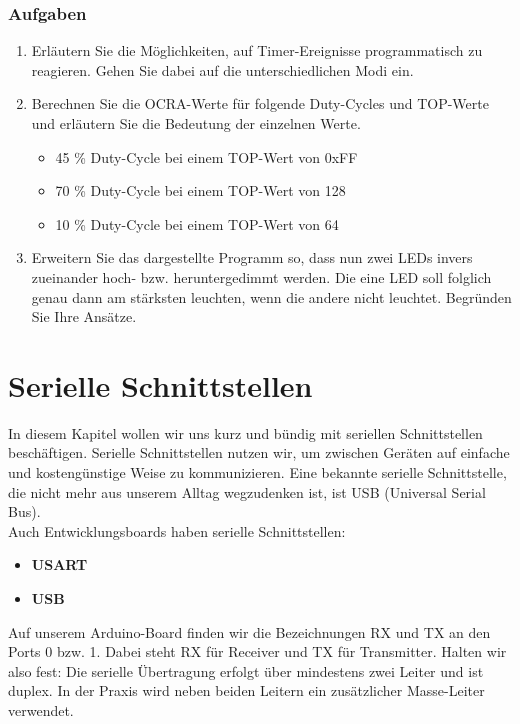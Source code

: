 \documentclass[11pt,a4paper]{scrartcl}
\begin{document}
\section*{Aufgaben}
\begin{enumerate}
\item Erläutern Sie die Möglichkeiten, auf Timer-Ereignisse programmatisch zu reagieren. Gehen Sie dabei auf die unterschiedlichen Modi ein.
\item Berechnen Sie die OCRA-Werte für folgende Duty-Cycles und TOP-Werte und erläutern Sie die Bedeutung der einzelnen Werte.
\begin{itemize}
\item 45 \% Duty-Cycle bei einem TOP-Wert von 0xFF
\item 70 \% Duty-Cycle bei einem TOP-Wert von 128
\item 10 \% Duty-Cycle bei einem TOP-Wert von 64
\end{itemize}
\item Erweitern Sie das dargestellte Programm so, dass nun zwei LEDs invers zueinander hoch- bzw. heruntergedimmt werden. Die eine LED soll folglich genau dann am stärksten leuchten, wenn die andere nicht leuchtet. Begründen Sie Ihre Ansätze.
\end{enumerate}
\pagebreak
\part{Serielle Schnittstellen}
In diesem Kapitel wollen wir uns kurz und bündig mit seriellen Schnittstellen beschäftigen. Serielle Schnittstellen nutzen wir, um zwischen Geräten auf einfache und kostengünstige Weise zu kommunizieren. Eine bekannte serielle Schnittstelle, die nicht mehr aus unserem Alltag wegzudenken ist, ist USB (Universal Serial Bus). \\
Auch Entwicklungsboards haben serielle Schnittstellen:
\begin{itemize}
\item \textbf{USART}
\item \textbf{USB}
\end{itemize}
Auf unserem Arduino-Board finden wir die Bezeichnungen {\glqq}RX{\grqq} und {\glqq}TX{\grqq} an den Ports 0 bzw. 1. Dabei steht RX für Receiver und TX für Transmitter. Halten wir also fest: Die serielle Übertragung erfolgt über mindestens zwei Leiter und ist duplex. In der Praxis wird neben beiden Leitern ein zusätzlicher Masse-Leiter verwendet.
\end{document}
